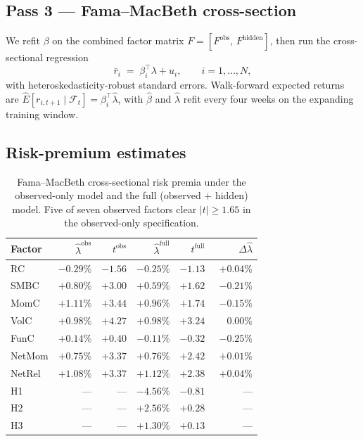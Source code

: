 \documentclass[11pt,a4paper]{article}
\begin{document}
\subsection{Pass 3 --- Fama--MacBeth cross-section}

We refit $\beta$ on the combined factor matrix $F = [F^\text{obs},\,F^\text{hidden}]$, then run the cross-sectional regression
\begin{equation}
\bar r_i \;=\; \beta_i^\top \lambda + u_i, \qquad i = 1,\dots,N,
\label{eq:pass3}
\end{equation}
with heteroskedasticity-robust standard errors. Walk-forward expected returns are $\widehat E[r_{i,t+1}\mid\mathcal F_t] = \beta_i^\top\hat\lambda$, with $\hat\beta$ and $\hat\lambda$ refit every four weeks on the expanding training window.

\subsection{Risk-premium estimates}

\begin{table}[H]
\centering
\caption{Fama--MacBeth cross-sectional risk premia under the observed-only model and the full (observed $+$ hidden) model. Five of seven observed factors clear $|t|\ge 1.65$ in the observed-only specification.}
\label{tab:lambda}
\small
\begin{tabular}{lrrrrr}
\toprule
Factor & $\hat\lambda^\text{obs}$ & $t^\text{obs}$ & $\hat\lambda^\text{full}$ & $t^\text{full}$ & $\Delta\hat\lambda$ \\
\midrule
RC      & $-0.29\%$ & $-1.56$ & $-0.25\%$ & $-1.13$ & $+0.04\%$ \\
SMBC    & $+0.80\%$ & $+3.00$ & $+0.59\%$ & $+1.62$ & $-0.21\%$ \\
MomC    & $+1.11\%$ & $+3.44$ & $+0.96\%$ & $+1.74$ & $-0.15\%$ \\
VolC    & $+0.98\%$ & $+4.27$ & $+0.98\%$ & $+3.24$ & $\phantom{+}0.00\%$ \\
FunC    & $+0.14\%$ & $+0.40$ & $-0.11\%$ & $-0.32$ & $-0.25\%$ \\
NetMom  & $+0.75\%$ & $+3.37$ & $+0.76\%$ & $+2.42$ & $+0.01\%$ \\
NetRel  & $+1.08\%$ & $+3.37$ & $+1.12\%$ & $+2.38$ & $+0.04\%$ \\
\midrule
H1      & --- & --- & $-4.56\%$ & $-0.81$ & --- \\
H2      & --- & --- & $+2.56\%$ & $+0.28$ & --- \\
H3      & --- & --- & $+1.30\%$ & $+0.13$ & --- \\
\bottomrule
\end{tabular}
\end{table}
\end{document}
